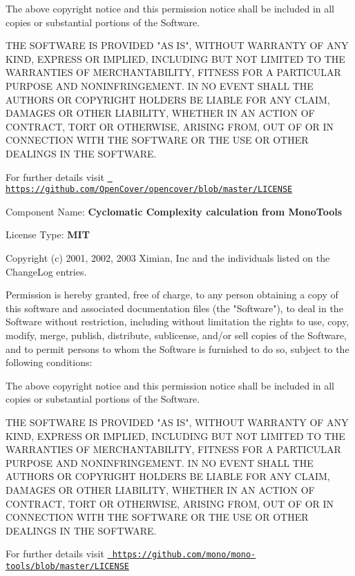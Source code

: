 The above copyright notice and this permission notice shall be included in all copies or substantial portions of the Software.

THE SOFTWARE IS PROVIDED "{}\+AS IS"{}, WITHOUT WARRANTY OF ANY KIND, EXPRESS OR IMPLIED, INCLUDING BUT NOT LIMITED TO THE WARRANTIES OF MERCHANTABILITY, FITNESS FOR A PARTICULAR PURPOSE AND NONINFRINGEMENT. IN NO EVENT SHALL THE AUTHORS OR COPYRIGHT HOLDERS BE LIABLE FOR ANY CLAIM, DAMAGES OR OTHER LIABILITY, WHETHER IN AN ACTION OF CONTRACT, TORT OR OTHERWISE, ARISING FROM, OUT OF OR IN CONNECTION WITH THE SOFTWARE OR THE USE OR OTHER DEALINGS IN THE SOFTWARE.

For further details visit \href{https://github.com/OpenCover/opencover/blob/master/LICENSE}{\texttt{ https\+://github.\+com/\+Open\+Cover/opencover/blob/master/\+LICENSE}}



Component Name\+: {\bfseries{Cyclomatic Complexity calculation from Mono\+Tools}}

License Type\+: {\bfseries{MIT}}

Copyright (c) 2001, 2002, 2003 Ximian, Inc and the individuals listed on the Change\+Log entries.

Permission is hereby granted, free of charge, to any person obtaining a copy of this software and associated documentation files (the "{}\+Software"{}), to deal in the Software without restriction, including without limitation the rights to use, copy, modify, merge, publish, distribute, sublicense, and/or sell copies of the Software, and to permit persons to whom the Software is furnished to do so, subject to the following conditions\+:

The above copyright notice and this permission notice shall be included in all copies or substantial portions of the Software.

THE SOFTWARE IS PROVIDED "{}\+AS IS"{}, WITHOUT WARRANTY OF ANY KIND, EXPRESS OR IMPLIED, INCLUDING BUT NOT LIMITED TO THE WARRANTIES OF MERCHANTABILITY, FITNESS FOR A PARTICULAR PURPOSE AND NONINFRINGEMENT. IN NO EVENT SHALL THE AUTHORS OR COPYRIGHT HOLDERS BE LIABLE FOR ANY CLAIM, DAMAGES OR OTHER LIABILITY, WHETHER IN AN ACTION OF CONTRACT, TORT OR OTHERWISE, ARISING FROM, OUT OF OR IN CONNECTION WITH THE SOFTWARE OR THE USE OR OTHER DEALINGS IN THE SOFTWARE.

For further details visit \href{https://github.com/mono/mono-tools/blob/master/LICENSE}{\texttt{ https\+://github.\+com/mono/mono-\/tools/blob/master/\+LICENSE}}

